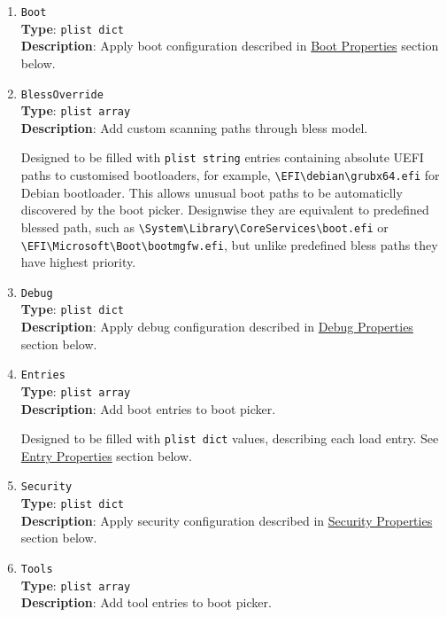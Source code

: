 \documentclass[]{article}
\begin{document}
\begin{enumerate}
\item
  \texttt{Boot}\\
  \textbf{Type}: \texttt{plist\ dict}\\
  \textbf{Description}: Apply boot configuration described in
  \hyperref[miscbootprops]{Boot Properties} section below.

\item
  \texttt{BlessOverride}\\
  \textbf{Type}: \texttt{plist\ array}\\
  \textbf{Description}: Add custom scanning paths through bless model.

  Designed to be filled with \texttt{plist\ string} entries containing
  absolute UEFI paths to customised bootloaders, for example,
  \texttt{\textbackslash EFI\textbackslash debian\textbackslash grubx64.efi}
  for Debian bootloader. This allows unusual boot paths to be automaticlly
  discovered by the boot picker. Designwise they are equivalent to predefined blessed path, such as
  \texttt{\textbackslash System\textbackslash Library\textbackslash CoreServices\textbackslash boot.efi}
  or \texttt{\textbackslash EFI\textbackslash Microsoft\textbackslash Boot\textbackslash bootmgfw.efi},
  but unlike predefined bless paths they have highest priority.

\item
  \texttt{Debug}\\
  \textbf{Type}: \texttt{plist\ dict}\\
  \textbf{Description}: Apply debug configuration described in
  \hyperref[miscdebugprops]{Debug Properties} section below.

\item
  \texttt{Entries}\\
  \textbf{Type}: \texttt{plist\ array}\\
  \textbf{Description}: Add boot entries to boot picker.

  Designed to be filled with \texttt{plist\ dict} values, describing each load entry.
  See \hyperref[miscentryprops]{Entry Properties} section below.

\item
  \texttt{Security}\\
  \textbf{Type}: \texttt{plist\ dict}\\
  \textbf{Description}: Apply security configuration described in
  \hyperref[miscsecurityprops]{Security Properties} section below.

\item
  \texttt{Tools}\\
  \textbf{Type}: \texttt{plist\ array}\\
  \textbf{Description}: Add tool entries to boot picker.


\end{enumerate}
\end{document}
